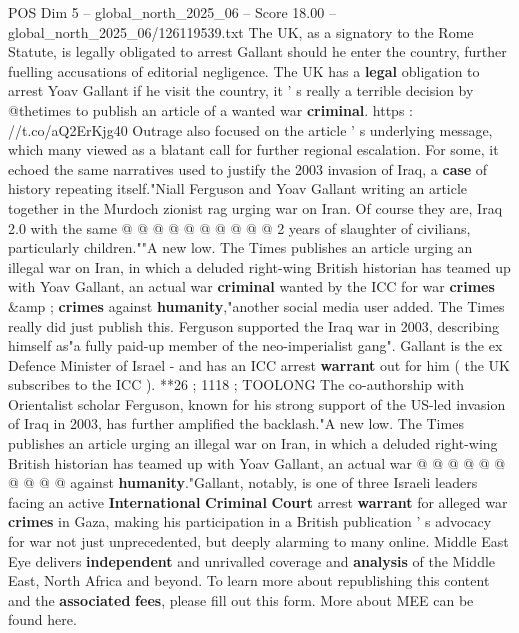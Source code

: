 \begin{textsample}{POS Dim 5 – global\_north\_2025\_06 – Score 18.00 – global\_north\_2025\_06/126119539.txt}
The UK, as a signatory to the Rome Statute, is legally obligated to arrest Gallant should he enter the country, further fuelling accusations of editorial negligence.
The UK has a \textbf{legal} obligation to arrest Yoav Gallant if he visit the country, it ' s really a terrible decision by @thetimes to publish an article of a wanted war \textbf{criminal}. https : //t.co/aQ2ErKjg40 Outrage also focused on the article ' s underlying message, which many viewed as a blatant call for further regional escalation.
For some, it echoed the same narratives used to justify the 2003 invasion of Iraq, a \textbf{case} of history repeating itself."Niall Ferguson and Yoav Gallant writing an article together in the Murdoch zionist rag urging war on Iran.
Of course they are, Iraq 2.0 with the same @ @ @ @ @ @ @ @ @ @ 2 years of slaughter of civilians, particularly children.""A new low.
The Times publishes an article urging an illegal war on Iran, in which a deluded right-wing British historian has teamed up with Yoav Gallant, an actual war \textbf{criminal} wanted by the ICC for war \textbf{crimes} \&amp ; \textbf{crimes} against \textbf{humanity},"another social media user added.
The Times really did just publish this.
Ferguson supported the Iraq war in 2003, describing himself as"a fully paid-up member of the neo-imperialist gang".
Gallant is the ex Defence Minister of Israel - and has an ICC arrest \textbf{warrant} out for him ( the UK subscribes to the ICC ). **26 ; 1118 ; TOOLONG The co-authorship with Orientalist scholar Ferguson, known for his strong support of the US-led invasion of Iraq in 2003, has further amplified the backlash."A new low.
The Times publishes an article urging an illegal war on Iran, in which a deluded right-wing British historian has teamed up with Yoav Gallant, an actual war @ @ @ @ @ @ @ @ @ @ against \textbf{humanity}."Gallant, notably, is one of three Israeli leaders facing an active \textbf{International} \textbf{Criminal} \textbf{Court} arrest \textbf{warrant} for alleged war \textbf{crimes} in Gaza, making his participation in a British publication ' s advocacy for war not just unprecedented, but deeply alarming to many online.
Middle East Eye delivers \textbf{independent} and unrivalled coverage and \textbf{analysis} of the Middle East, North Africa and beyond.
To learn more about republishing this content and the \textbf{associated} \textbf{fees}, please fill out this form.
More about MEE can be found here.

\end{textsample}

